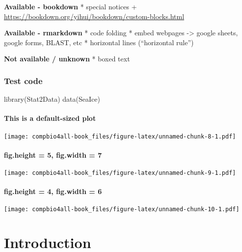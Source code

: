 \documentclass[
]{book}
\newenvironment{Shaded}{\begin{snugshade}}{\end{snugshade}}
\newcommand{\FunctionTok}[1]{\textcolor[rgb]{0.00,0.00,0.00}{#1}}
\newcommand{\NormalTok}[1]{#1}
\begin{document}
\textbf{Available - bookdown}
* special notices
+ \url{https://bookdown.org/yihui/bookdown/custom-blocks.html}

\textbf{Available - rmarkdown}
* code folding
* embed webpages -\textgreater{} google sheets, google forms, BLAST, etc
* horizontal lines (``horizontal rule'')

\textbf{Not available / unknown}
* boxed text

\hypertarget{test-code}{%
\section{Test code}\label{test-code}}

\begin{Shaded}
\begin{Highlighting}[]
\FunctionTok{library}\NormalTok{(Stat2Data)}
\FunctionTok{data}\NormalTok{(SeaIce)}
\end{Highlighting}
\end{Shaded}

\hypertarget{this-is-a-default-sized-plot}{%
\subsection{This is a default-sized plot}\label{this-is-a-default-sized-plot}}

\texttt{[image: compbio4all-book\_files/figure-latex/unnamed-chunk-8-1.pdf]}

\hypertarget{fig.height-5-fig.width-7}{%
\subsection{fig.height = 5, fig.width = 7}\label{fig.height-5-fig.width-7}}

\texttt{[image: compbio4all-book\_files/figure-latex/unnamed-chunk-9-1.pdf]}

\hypertarget{fig.height-4-fig.width-6}{%
\subsection{fig.height = 4, fig.width = 6}\label{fig.height-4-fig.width-6}}

\texttt{[image: compbio4all-book\_files/figure-latex/unnamed-chunk-10-1.pdf]}

\hypertarget{part-introduction}{%
\part{Introduction}\label{part-introduction}}
\end{document}
